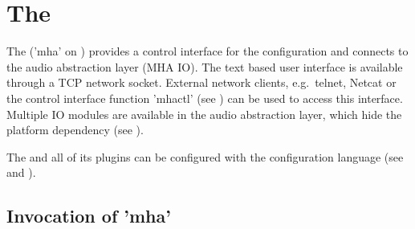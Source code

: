 
\section{The \mhad{}}\label{sec:linuxmhaserver}\label{sec:frameworks}

The \mhad{} ('mha' on \Linux{}) provides a control interface for 
the configuration and connects to the audio abstraction layer (MHA IO).
%
The text based user interface is available through a TCP network
socket.
%
External network clients, e.g.\ telnet, Netcat or the \Matlab{} control
interface function 'mhactl' (see ) can be used
to access this interface.
%
Multiple IO modules are available in the audio abstraction layer,
which hide the platform dependency (see
).
%

The \mhad{} and all of its plugins can be configured with the \mha{}
configuration language (see  and ).
%


\subsection{Invocation of 'mha'}

